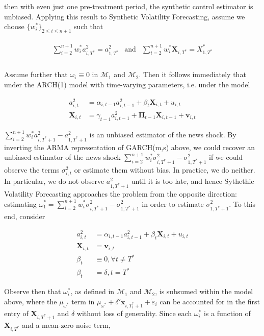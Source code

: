 \documentclass[11pt]{article}
\def\mbf#1{\mathbf{#1}} %
\def\t#1{\tilde{#1}} %
\def\mc#1{\mathcal{#1}} %
\def\mc#1{\mathcal{#1}}
\theoremstyle{definition}
\newenvironment{proof-of-proposition}[1][{}]{\noindent{\bf
    Proof of Proposition {#1}}
  \hspace*{.5em}}{\qed\bigskip\\}
\begin{document}
\begin{proof-of-proposition}
then with even just one pre-treatment period, the synthetic control estimator is unbiased.  Applying this result to Synthetic Volatility Forecasting, assume we choose $\{w_{i}^{*}\}_{2\leq i \leq n + 1}$ such that

\begin{align*}
\begin{array}{lll}
\sum^{n+1}_{i=2}w_{i}^{*}a^{2}_{i,T^{*}} = a^{2}_{1,T^{*}} & \text{and} & \sum^{n+1}_{i=2}w_{i}^{*}\bm{X}_{i,T^{*}} = X_{1,T^{*}}^{*} \\
\end{array}
\end{align*}\label{adapted Abadie assumptions}

Assume further that $\omega_{i} \equiv 0$ in $\mc{M}_1$ and $\mc{M}_2$. Then it follows immediately that under the ARCH(1) model with time-varying parameters, i.e. under the model

\begin{align*}
  a^{2}_{i,t} &= \alpha_{i,t-1}a^{2}_{i,t-1} + \beta_{t} \bm{X}_{i,t}  + u_{i,t} \\
 \textbf{X}_{i,t} &= \gamma_{t-1}a^{2}_{i,t-1} + \bm{\Pi}_{t-1}\bm{X}_{i,t-1} + \bm{v}_{i,t}
\end{align*}

$ \sum^{n+1}_{i=2}w_{i}^{*}a^{2}_{i,T^{*}+1} - a^{2}_{1,T^{*}+1}$ is an unbiased estimator of the news shock.  By inverting the ARMA representation of GARCH(m,s) above, we could recover an unbiased estimator of the news shock $\sum^{n+1}_{i=2}w_{i}^{*}\sigma^{2}_{i,T^{*}+1} - \sigma^{2}_{1,T^{*}+1}$ if we could observe the terms $\sigma^{2}_{i,t}$ or estimate them without bias.  In practice, we do neither.  In particular, we do not observe $a^{2}_{1,T^{*}+1}$ until it is too late, and hence Sythethic Volatility Forecasting approaches the problem from the opposite direction: estimating $\omega^{*}_{1} = \sum^{n+1}_{i=2}w_{i}^{*}\sigma^{2}_{i,T^{*}+1} - \sigma^{2}_{1,T^{*}+1}$ in order to estimate $\sigma^{2}_{1,T^{*}+1}$.  To this end, consider

\begin{align*}
  a^{2}_{i,t} &= \alpha_{i,t-1}a^{2}_{i,t-1} + \beta_{t} \bm{X}_{i,t}  + u_{i,t} \\
 \textbf{X}_{i,t} &= \bm{v}_{i,t} \\
 \beta_{t} & \equiv 0, \forall t \neq T^{*}\\
 \beta_{t} &= \delta, t = T^{*}
\end{align*}

Observe then that $\omega^{*}_{i}$, as defined in $\mc{M}_1$ and $\mc{M}_2$, is subsumed within the model above, where the $\mu_{\omega^{*}}$ term in $\mu_{\omega^{*}}+\delta'\mbf{x}_{i, T_i^*+1}+ \t{\varepsilon}_{i}$ can be accounted for in the first entry of $\bm{X}_{i,T^{*}+1}$ and $\delta$ without loss of generality.  Since each $\omega_{i}^{*}$ is a function of $\bm{X}_{i,T^{*}}$ and a mean-zero noise term, 

\end{proof-of-proposition}
\end{document}
